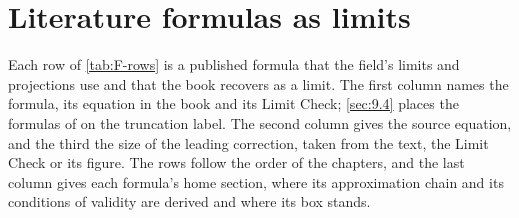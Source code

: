 \chapter{Literature formulas as limits}\label{app:F}
Each row of \cref{tab:F-rows} is a published formula that the field's limits and projections use and that the book recovers as a limit. The first column names the formula, its equation in the book and its Limit Check; \cref{sec:9.4} places the formulas of  on the truncation label. The second column gives the source equation, and the third the size of the leading correction, taken from the text, the Limit Check or its figure. The rows follow the order of the chapters, and the last column gives each formula's home section, where its approximation chain and its conditions of validity are derived and where its box stands.


\printbibliography[heading=subbibliography]
